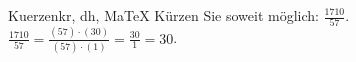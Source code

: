 \begin{MAufgabe}{Kuerzen}{kr, dh, MaTeX}
K\"urzen Sie soweit m\"oglich: $\frac{1710}{57}$.\\ 
\ifLsg\MLoesung
\quad $\frac{1710}{57}=\frac{(57)\cdot(30)}{(57)\cdot(1)}=\frac{30}{1}=30$.\else\relax\fi
 \end{MAufgabe}